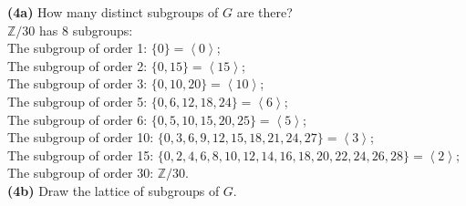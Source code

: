 \documentclass[12pt,letterpaper]{article}
\begin{document}
\textbf{(4a)} How many distinct subgroups of \(G\) are there? \\

\(\mathbb{Z}/30\) has 8 subgroups: \\

The subgroup of order 1: \(\{0\} = \left<0\right>\); \\

The subgroup of order 2: \(\{0, 15\} = \left< 15\right>\); \\

The subgroup of order 3: \(\{0,10,20\} = \left<10\right>\); \\

The subgroup of order 5: \(\{0,6,12,18,24\} = \left<6\right>\); \\

The subgroup of order 6: \(\{0,5,10,15,20,25\} = \left<5\right>\); \\

The subgroup of order 10: \(\{0,3,6,9,12,15,18,21,24,27\} = \left< 3 \right>\); \\

The subgroup of order 15: \(\{0,2,4,6,8,10,12,14,16,18,20,22,24,26,28\} = \left< 2 \right >\); \\

The subgroup of order 30: \(\mathbb{Z}/30\). \\

\textbf{(4b)} Draw the lattice of subgroups of \(G\). \\
\end{document}
